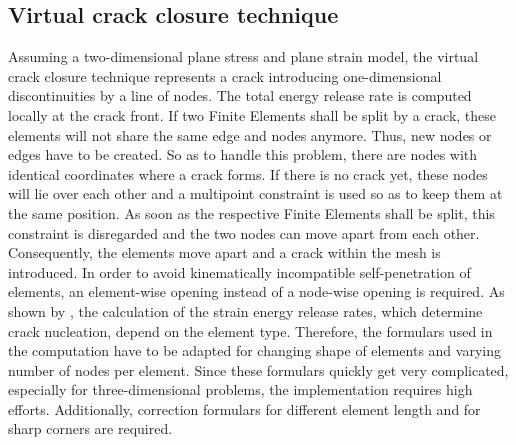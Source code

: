 \subsection{Virtual crack closure technique} \label{sec:intro_virtClos}
Assuming a two-dimensional plane stress and plane strain model, the virtual crack closure technique represents a crack introducing one-dimensional discontinuities by a line of nodes. The total energy release rate is computed locally at the crack front. If two Finite Elements shall be split by a crack, these elements will not share the same edge and nodes anymore. Thus, new nodes or edges have to be created. So as to handle this problem, there are nodes with identical coordinates where a crack forms. If there is no crack yet, these nodes will lie over each other and a multipoint constraint is used so as to keep them at the same position. As soon as the respective Finite Elements shall be split, this constraint is disregarded and the two nodes can move apart from each other. Consequently, the elements move apart and a crack within the mesh is introduced. In order to avoid kinematically incompatible self-penetration of elements, an element-wise opening instead of a node-wise opening is required. As shown by \citet{03_SotA_virtClos}, the calculation of the strain energy release rates, which determine crack nucleation, depend on the element type. Therefore, the formulars used in the computation have to be adapted for changing shape of elements and varying number of nodes per element. Since these formulars quickly get very complicated, especially for three-dimensional problems, the implementation requires high efforts. Additionally, correction formulars for different element length and for sharp corners are required. \cite{03_SotA_virtClos} 

